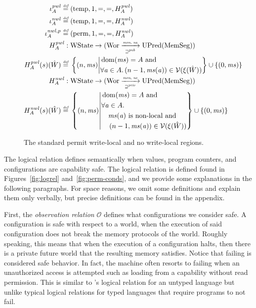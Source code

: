 \documentclass[format=acmsmall, review=true, screen=true]{acmart}
\renewcommand{\figurename}{Figure}
\newcommand{\fun}{\rightarrow}
\newcommand{\defeq}{\stackrel{\textit{\tiny{def}}}{=}}
\newcommand{\union}{\mathbin{\cup}}
\DeclareMathOperator{\dom}{dom}
\newcommand\dominique[1]{{\color{purple} \sf \footnotesize {DD: #1}}\\}
\renewcommand\dominique[1]{}
\newcommand{\var}[1]{\mathit{#1}}
\newcommand{\hs}{\var{ms}}
\newcommand{\ms}{\hs}
\newcommand{\addr}{\var{a}}
\newcommand{\nwl}{\var{nwl}}
\newcommand{\pwl}{\var{pwl}}
\newcommand{\futurewk}{\mathbin{\sqsupseteq}^{\var{pub}}}
\newcommand{\futurestr}{\mathbin{\sqsupseteq}^{\var{priv}}}
\newcommand{\monwknefun}{\xrightarrow[\text{\tiny{$\futurewk$}}]{\textit{\tiny{mon, ne}}}}
\newcommand{\monstrnefun}{\xrightarrow[\text{\tiny{$\futurestr$}}]{\textit{\tiny{mon, ne}}}}
\newcommand{\asmType}{\plaindom{AsmType}}
\newcommand{\plaindom}[1]{\mathrm{#1}}
\newcommand{\HeapSegments}{\plaindom{MemSeg}}
\newcommand{\States}{\plaindom{WState}}
\newcommand{\Wor}{\plaindom{Wor}}
\newcommand{\UPred}[1]{\plaindom{UPred}(#1)}
\newcommand{\intr}[2]{\mathcal{#1}}
\newcommand{\valueintr}[1]{\intr{V}{#1}}
\newcommand{\stdvr}{\valueintr{\asmType}}
\newcommand{\observations}{\mathcal{O}}
\newcommand{\npair}[2][n]{\left(#1,#2 \right)}
\newcommand{\plainview}[1]{\mathrm{#1}}
\newcommand{\perma}{\plainview{perm}}
\newcommand{\temp}{\plainview{temp}}
\newcommand{\nonlocal}[1]{\ensuremath{#1} \text{ is non-local}}
\begin{document}
{\begin{figure}[htb]
\begin{align*}
  \iota^\pwl_A \defeq{} & (\temp,1,=,=,H^\pwl_A) \\
  \iota^\nwl_A \defeq{} & (\temp,1,=,=,H^\nwl_A) \\
  \iota^{\nwl,p}_A \defeq{} & (\perma,1,=,=,H^\nwl_A)\\
    H^\pwl_A :{} & \States \fun (\Wor \monwknefun \UPred{\HeapSegments})\\
  H^\pwl_A (s)(\hat{W}) \defeq{} & \left\{\npair{\hs} \middle|
    \begin{aligned}
      &\dom(\hs) = A \text{ and } \\
      &\forall \addr \in A \ldotp \npair[n-1]{\hs(\addr)} \in \stdvr(\xi(\hat{W}))
    \end{aligned}
        \right\} \union \{\npair[0]{\ms} \} \\
    H^\nwl_A :{} & \States \fun (\Wor \monstrnefun \UPred{\HeapSegments})\\
  H^\nwl_A (s)(\hat{W}) \defeq{} & \left\{\npair{\hs} \middle|
    \begin{aligned}
      &\dom(\hs) = A \text{ and } \\
      &\forall \addr \in A \ldotp \\
      &\quad \nonlocal{\ms(\addr)} \text{ and }\\ 
      &\quad \npair[n-1]{\hs(\addr)} \in \stdvr(\xi(\hat{W}))
    \end{aligned}
        \right\} \union \{\npair[0]{\ms} \}
\end{align*}

  \caption{The standard permit write-local and no write-local regions.}
  \label{fig:std-reg}
\end{figure}
}


The logical relation defines semantically when values, program
counters, and configurations are capability safe. The logical relation is defined
found in \figurename{}s~\ref{fig:logrel} and~\ref{fig:perm-conds}, and
we provide some explanations in the following paragraphs. For space
reasons, we omit some definitions and explain them only verbally, but
precise definitions can be found in the appendix.

First, the \emph{observation relation} $\observations$ defines what
configurations we consider safe. A configuration is safe
with respect to a world, when the execution of said configuration does not break
the memory protocols of the world. Roughly speaking, this means that when the
execution of a configuration halts, then there is a private future world that
the resulting memory satisfies. Notice that failing is considered safe behavior.
In fact, the machine often resorts to failing when an unauthorized access is
attempted such as loading from a capability without read permission. This is
similar to \citet{Devriese:2016ObjCap}'s logical relation for an untyped
language but unlike typical logical relations for typed languages that
require programs to not fail.
\end{document}
